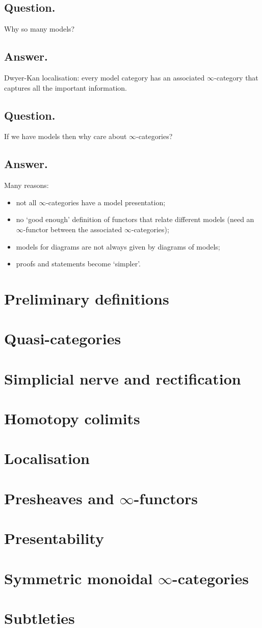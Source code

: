\documentclass{article}
\numberwithin{equation}{subsection}
\renewcommand{\ss}[1]{\subsection{#1}}
\begin{document}
        \ss{Question.}
            Why so many models?

        \ss{Answer.}
            Dwyer-Kan localisation: every model category has an associated $\infty$-category that captures all the important information.

        \ss{Question.}
            If we have models then why care about $\infty$-categories?

        \ss{Answer.}
            Many reasons:
            \begin{itemize}
                \item not all $\infty$-categories have a model presentation;
                \item no `good enough' definition of functors that relate different models (need an $\infty$-functor between the associated $\infty$-categories);
                \item models for diagrams are not always given by diagrams of models;
                \item proofs and statements become `simpler'.
            \end{itemize}

    \section{Preliminary definitions}

    \section{Quasi-categories}

    \section{Simplicial nerve and rectification}

    \section{Homotopy colimits}

    \section{Localisation}

    \section{Presheaves and $\infty$-functors}

    \section{Presentability}

    \section{Symmetric monoidal $\infty$-categories}

    \section{Subtleties}
\end{document}
